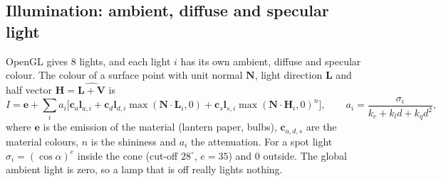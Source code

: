 \documentclass[10pt,a4paper]{article}
\begin{document}
\subsection{Illumination: ambient, diffuse and specular light}\label{sec:light}
OpenGL gives 8 lights, and each light $i$ has its own ambient, diffuse and specular colour. The colour of a surface point with unit normal $\mathbf N$, light direction $\mathbf L$ and half vector $\mathbf H=\widehat{\mathbf L+\mathbf V}$ is
\begin{equation}
I=\mathbf e+\sum_i a_i\Big[\mathbf c_a\mathbf l_{a,i}+\mathbf c_d\mathbf l_{d,i}\max(\mathbf N\!\cdot\!\mathbf L_i,0)+\mathbf c_s\mathbf l_{s,i}\max(\mathbf N\!\cdot\!\mathbf H_i,0)^{n}\Big],\qquad a_i=\frac{\sigma_i}{k_c+k_l d+k_q d^2},
\end{equation}
where $\mathbf e$ is the emission of the material (lantern paper, bulbs), $\mathbf c_{a,d,s}$ are the material colours, $n$ is the shininess and $a_i$ the attenuation. For a spot light $\sigma_i=(\cos\alpha)^e$ inside the cone (cut-off $28^\circ$, $e=35$) and $0$ outside. The global ambient light is zero, so a lamp that is off really lights nothing.
\end{document}
